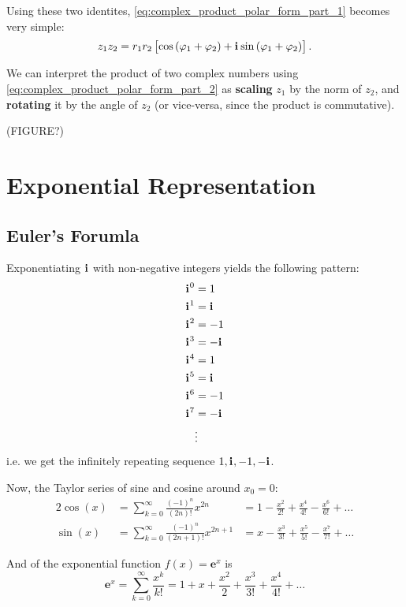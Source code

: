\documentclass{article}
\newcommand{\iu}{\mathbf{i}\mkern1mu}
\newcommand{\Eu}[1]{\mathbf{e}^{#1}}
\newcommand{\zpolar}[2]{#1\left[\cos\left(#2\right)+\iu\sin\left(#2\right)\right]}
\begin{document}
Using these two identites, \autoref{eq:complex_product_polar_form_part_1} becomes very simple:
\begin{equation}
	z_{1}z_{2} = r_{1}r_{2}\zpolar{}{\varphi_{1}+\varphi_{2}}.
	\label{eq:complex_product_polar_form_part_2}
\end{equation}

We can interpret the product of two complex numbers using \autoref{eq:complex_product_polar_form_part_2} as \textbf{scaling} $z_{1}$ by the norm of $z_{2}$, and \textbf{rotating} it by the angle of $z_{2}$ (or vice-versa, since the product is commutative).

(FIGURE?)

\section{Exponential Representation}
\subsection{Euler's Forumla}
Exponentiating $\iu$ with non-negative integers yields the following pattern:
\begin{align*}
	\iu^0 & = 1    \\
	\iu^1 & = \iu  \\
	\iu^2 & = -1   \\
	\iu^3 & = -\iu \\
	\iu^4 & = 1    \\
	\iu^5 & = \iu  \\
	\iu^6 & = -1   \\
	\iu^7 & = -\iu \\
	      & \vdots
\end{align*}
i.e. we get the infinitely repeating sequence ${1, \iu, -1, -\iu}$.

Now, the Taylor series of sine and cosine around $x_{0}=0$:
\begin{alignat}{2}
	\cos(x) & = \sum\limits_{k=0}^{\infty} \frac{(-1)^{n}}{(2n)!}x^{2n}     & = 1 - \frac{x^2}{2!} + \frac{x^4}{4!} - \frac{x^6}{6!} + \dots \\
	\sin(x) & = \sum\limits_{k=0}^{\infty} \frac{(-1)^{n}}{(2n+1)!}x^{2n+1} & = x-\frac{x^3}{3!}+\frac{x^5}{5!} - \frac{x^7}{7!} + \dots
	\label{eq:cosine_and_sine_taylor}
\end{alignat}

And of the exponential function $f(x)=\Eu{x}$ is
\begin{equation}
	\Eu{x} = \sum\limits_{k=0}^{\infty} \frac{x^{k}}{k!} = 1 + x + \frac{x^2}{2} + \frac{x^3}{3!} + \frac{x^4}{4!} + \dots
	\label{eq:exp_taylor}
\end{equation}
\end{document}
